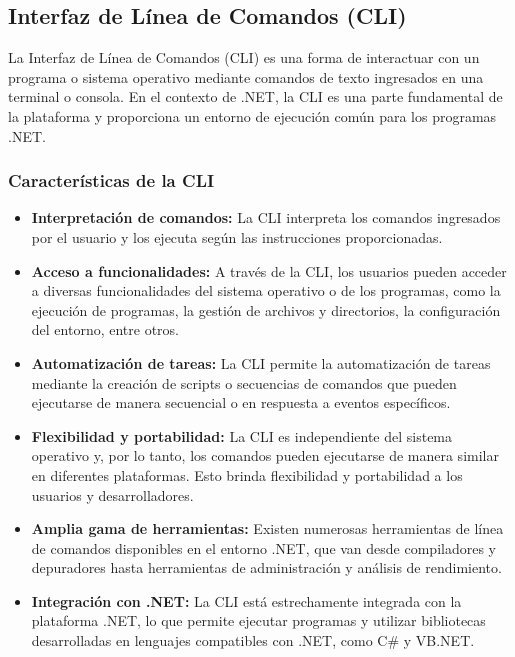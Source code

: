 \documentclass[executivepaper]{article}
\begin{document}
\subsection{Interfaz de Línea de Comandos (CLI)}
 
La Interfaz de Línea de Comandos (CLI) es una forma de interactuar con un programa o sistema operativo mediante comandos de texto ingresados en una terminal o consola. En el contexto de .NET, la CLI es una parte fundamental de la plataforma y proporciona un entorno de ejecución común para los programas .NET.

\subsubsection*{Características de la CLI}

\begin{itemize}
  \item \textbf{Interpretación de comandos:} La CLI interpreta los comandos ingresados por el usuario y los ejecuta según las instrucciones proporcionadas.

  \item \textbf{Acceso a funcionalidades:} A través de la CLI, los usuarios pueden acceder a diversas funcionalidades del sistema operativo o de los programas, como la ejecución de programas, la gestión de archivos y directorios, la configuración del entorno, entre otros.

  \item \textbf{Automatización de tareas:} La CLI permite la automatización de tareas mediante la creación de scripts o secuencias de comandos que pueden ejecutarse de manera secuencial o en respuesta a eventos específicos.

  \item \textbf{Flexibilidad y portabilidad:} La CLI es independiente del sistema operativo y, por lo tanto, los comandos pueden ejecutarse de manera similar en diferentes plataformas. Esto brinda flexibilidad y portabilidad a los usuarios y desarrolladores.

  \item \textbf{Amplia gama de herramientas:} Existen numerosas herramientas de línea de comandos disponibles en el entorno .NET, que van desde compiladores y depuradores hasta herramientas de administración y análisis de rendimiento.

  \item \textbf{Integración con .NET:} La CLI está estrechamente integrada con la plataforma .NET, lo que permite ejecutar programas y utilizar bibliotecas desarrolladas en lenguajes compatibles con .NET, como C\# y VB.NET.
\end{itemize}
\end{document}
